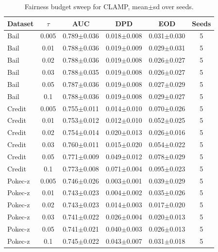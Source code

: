 \begin{table}[tbp]
\centering
\small
\caption{Fairness budget sweep for CLAMP, mean$\pm$sd over seeds.}
\label{tab:e2_tau}
\begin{tabular}{lccccc}
\toprule
Dataset & $\tau$ & AUC & DPD & EOD & Seeds \\
\midrule
Bail & 0.005 & 0.789$\pm$0.036 & 0.018$\pm$0.008 & 0.031$\pm$0.030 & 5 \\
Bail & 0.01 & 0.788$\pm$0.036 & 0.019$\pm$0.009 & 0.029$\pm$0.031 & 5 \\
Bail & 0.02 & 0.788$\pm$0.036 & 0.019$\pm$0.008 & 0.026$\pm$0.027 & 5 \\
Bail & 0.03 & 0.788$\pm$0.035 & 0.019$\pm$0.008 & 0.026$\pm$0.027 & 5 \\
Bail & 0.05 & 0.787$\pm$0.036 & 0.019$\pm$0.008 & 0.027$\pm$0.029 & 5 \\
Bail & 0.1 & 0.788$\pm$0.036 & 0.019$\pm$0.008 & 0.029$\pm$0.027 & 5 \\
Credit & 0.005 & 0.755$\pm$0.011 & 0.014$\pm$0.010 & 0.070$\pm$0.026 & 5 \\
Credit & 0.01 & 0.753$\pm$0.012 & 0.012$\pm$0.010 & 0.052$\pm$0.025 & 5 \\
Credit & 0.02 & 0.754$\pm$0.014 & 0.020$\pm$0.013 & 0.026$\pm$0.016 & 5 \\
Credit & 0.03 & 0.760$\pm$0.011 & 0.015$\pm$0.020 & 0.054$\pm$0.022 & 5 \\
Credit & 0.05 & 0.771$\pm$0.009 & 0.049$\pm$0.012 & 0.078$\pm$0.029 & 5 \\
Credit & 0.1 & 0.773$\pm$0.008 & 0.071$\pm$0.004 & 0.095$\pm$0.023 & 5 \\
Pokec-z & 0.005 & 0.746$\pm$0.026 & 0.003$\pm$0.001 & 0.039$\pm$0.029 & 5 \\
Pokec-z & 0.01 & 0.743$\pm$0.023 & 0.004$\pm$0.002 & 0.035$\pm$0.026 & 5 \\
Pokec-z & 0.02 & 0.743$\pm$0.023 & 0.014$\pm$0.003 & 0.017$\pm$0.020 & 5 \\
Pokec-z & 0.03 & 0.741$\pm$0.022 & 0.026$\pm$0.004 & 0.020$\pm$0.013 & 5 \\
Pokec-z & 0.05 & 0.741$\pm$0.021 & 0.040$\pm$0.003 & 0.026$\pm$0.013 & 5 \\
Pokec-z & 0.1 & 0.745$\pm$0.022 & 0.043$\pm$0.007 & 0.031$\pm$0.018 & 5 \\
\bottomrule
\end{tabular}
\end{table}

